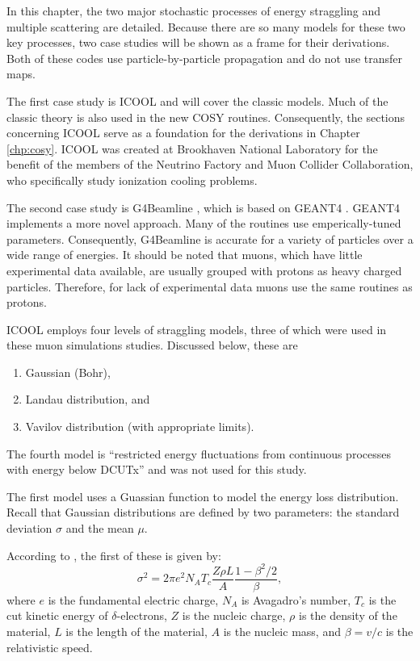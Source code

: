 In this chapter, the two major stochastic processes of energy straggling and multiple scattering are detailed. Because there are so many models for these two key processes, two case studies will be shown as a frame for their derivations. Both of these codes use particle-by-particle propagation and do not use transfer maps.

The first case study is ICOOL \cite{icool} and will cover the classic models. Much of the classic theory is also used in the new COSY routines. Consequently, the sections concerning ICOOL serve as a foundation for the derivations in Chapter \ref{chp:cosy}. ICOOL was created at Brookhaven National Laboratory for the benefit of the members of the Neutrino Factory and Muon Collider Collaboration, who specifically study ionization cooling problems.

The second case study is G4Beamline \cite{g4bl}, which is based on GEANT4 \cite{geant4}. GEANT4 implements a more novel approach. Many of the routines use emperically-tuned parameters. Consequently, G4Beamline is accurate for a variety of particles over a wide range of energies. It should be noted that muons, which have little experimental data available, are usually grouped with protons as heavy charged particles. Therefore, for lack of experimental data muons use the same routines as protons.

 \label{sec:ICOOLStraggling}\par
ICOOL \cite{icool} employs four levels of straggling models, three of which were used in these muon simulations studies. Discussed below, these are
\begin{enumerate}
\item{Gaussian (Bohr)},
\item{Landau distribution}, and
\item{Vavilov distribution (with appropriate limits)}.
\end{enumerate}
The fourth model is ``restricted energy fluctuations from continuous processes with energy below DCUTx'' and was not used for this study.

 \label{ssc:ICOOLStragglingGaussian}
The first model uses a Guassian function to model the energy loss distribution. Recall that Gaussian distributions are defined by two parameters: the standard deviation $\sigma$ and the mean $\mu$. 

According to \cite{geant4}, the first of these is given by:
\begin{equation}\label{eqn:bohrvariance}
\sigma^2=2\pi e^2 N_A T_c \frac{Z\rho L}{A} \frac{1-\beta^2/2}{\beta},
\end{equation}
where $e$ is the fundamental electric charge, $N_A$ is Avagadro's number, $T_c$ is the cut kinetic energy of $\delta$-electrons, $Z$ is the nucleic charge, $\rho$ is the density of the material, $L$ is the length of the material, $A$ is the nucleic mass, and $\beta=v/c$ is the relativistic speed.

